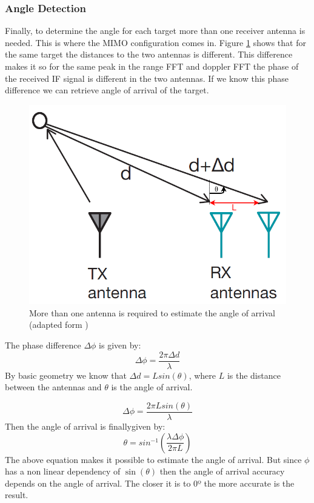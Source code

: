 \subsubsection{Angle Detection}
Finally, to determine the angle for each target more than one receiver antenna is needed. This is where the \ac{MIMO} configuration comes in. Figure \ref{fig:angle} shows that for the same target the distances to the two antennas is different.  This difference makes it so for the same peak in the range \ac{FFT} and doppler \ac{FFT} the phase of the received \ac{IF} signal is different in the two antennas. If we know this phase difference we can retrieve angle of arrival of the target. 
\begin{figure}[ht!] 
\centerline{\includegraphics [width=0.7 \textwidth]{imgs/chapter2/angle2.png}}
\caption[Angle of arrival estimation using more than one antenna]{More than one antenna is required to estimate the angle of arrival (adapted form \cite{iovescu2017fundamentals})}
\label{fig:angle}
\end{figure}
The phase difference $\Delta \phi$ is given by:
\begin{equation}
    \Delta \phi=\frac{2 \pi \Delta d}{\lambda}
\end{equation}
By basic geometry we know that $\Delta d =L sin(\theta)$, where $L$ is the distance between the antennas and $\theta$ is the angle of arrival. 

\begin{equation}
    \Delta \phi=\frac{2 \pi L sin(\theta)}{\lambda}
\end{equation}
Then the angle of arrival is finallygiven by:
\begin{equation}
    \theta = sin^{-1}(\frac{\lambda \Delta \phi}{2 \pi L})
\end{equation}
The above equation makes it possible to estimate the angle of arrival. But since $\phi$ has a non linear dependency of $\sin(\theta)$ then the angle of arrival accuracy depends on the angle of arrival. The closer it is to 0º the more accurate is the result.

